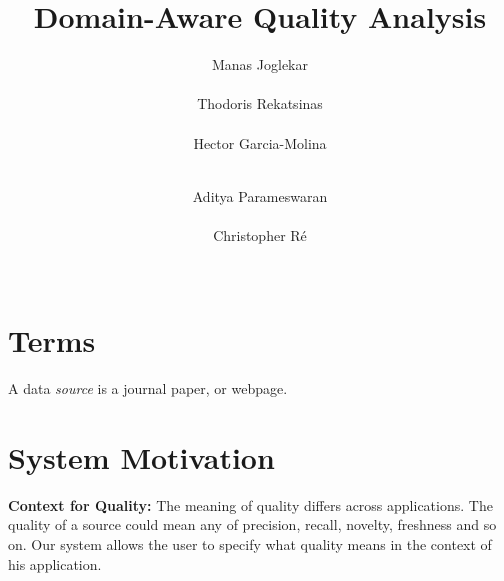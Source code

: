 \documentclass{sig-alternate}
\newcommand{\stitle}[1]{\vspace{0.5em}\noindent\textbf{#1}}
\begin{document}
\title{Domain-Aware Quality Analysis}
\author{
\alignauthor
Manas Joglekar\\
       \\
\alignauthor
Thodoris Rekatsinas\\
       \\
\alignauthor
Hector Garcia-Molina\\
       \\
\and
\alignauthor 
Aditya Parameswaran\\
       \\
\alignauthor
Christopher R\'e\\
       \\
}
\maketitle

\section{Terms}
A data {\em source} is a journal paper, or webpage. 

\section{System Motivation}

\stitle{Context for Quality:} The meaning of quality differs across applications. The quality of a source could mean any of precision, recall, novelty, freshness and so on. Our system allows the user to specify what quality means in the context of his application.
\end{document}
